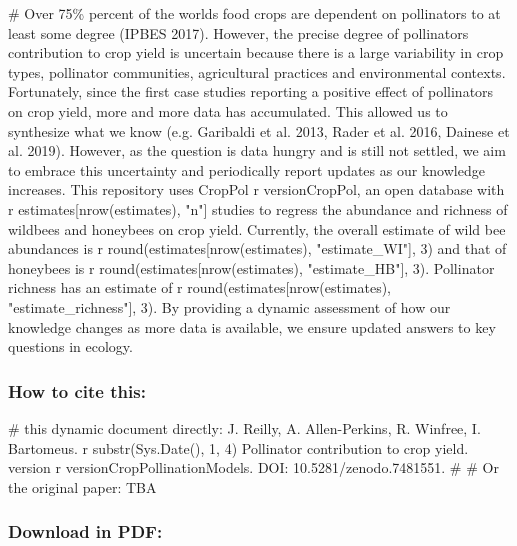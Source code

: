 \documentclass[
  letterpaper,
  DIV=11,
  numbers=noendperiod]{scrartcl}
\newenvironment{Shaded}{\begin{snugshade}}{\end{snugshade}}
\newcommand{\CommentTok}[1]{\textcolor[rgb]{0.37,0.37,0.37}{#1}}
\begin{document}
\begin{Shaded}
\begin{Highlighting}[]
\CommentTok{\# Over 75\% percent of the world\textquotesingle{}s food crops are dependent on pollinators to at least some degree (IPBES 2017). However, the precise degree of pollinators contribution to crop yield is uncertain because there is a large variability in crop types, pollinator communities, agricultural practices and environmental contexts. Fortunately, since the first case studies reporting a positive effect of pollinators on crop yield, more and more data has accumulated. This allowed us to synthesize what we know (e.g. Garibaldi et al. 2013, Rader et al. 2016, Dainese et al. 2019). However, as the question is data hungry and is still not settled, we aim to embrace this uncertainty and periodically report updates as our knowledge increases. This repository uses CropPol r versionCropPol, an open database with r estimates[nrow(estimates), "n"] studies to regress the abundance and richness of wildbees and honeybees on crop yield. Currently, the overall estimate of wild bee abundances is r round(estimates[nrow(estimates), "estimate\_WI"], 3) and that of honeybees is r round(estimates[nrow(estimates), "estimate\_HB"], 3). Pollinator richness has an estimate of r round(estimates[nrow(estimates), "estimate\_richness"], 3). By providing a dynamic assessment of how our knowledge changes as more data is available, we ensure updated answers to key questions in ecology.}
\end{Highlighting}
\end{Shaded}

\subsubsection{How to cite this:}\label{how-to-cite-this}

\begin{Shaded}
\begin{Highlighting}[]
\CommentTok{\# this dynamic document directly: J. Reilly, A. Allen{-}Perkins, R. Winfree, I. Bartomeus. r substr(Sys.Date(), 1, 4) Pollinator contribution to crop yield. version r versionCropPollinationModels. DOI: 10.5281/zenodo.7481551.}
\CommentTok{\# }
\CommentTok{\# Or the original paper: TBA}
\end{Highlighting}
\end{Shaded}

\subsubsection{Download in PDF:}\label{download-in-pdf}
\end{document}
